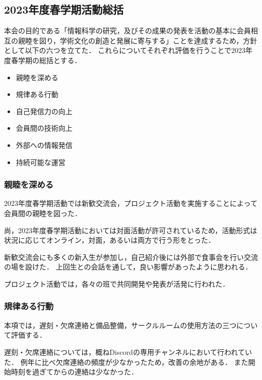 \subsection*{2023年度春学期活動総括}


本会の目的である「情報科学の研究，及びその成果の発表を活動の基本に会員相互の親睦を図り，学術文化の創造と発展に寄与する」ことを達成するため，方針として以下の六つを立てた．
これらについてそれぞれ評価を行うことで2023年度春学期の総括とする．

\begin{itemize}
  \item 親睦を深める
  \item 規律ある行動
  \item 自己発信力の向上
  \item 会員間の技術向上
  \item 外部への情報発信
  \item 持続可能な運営
\end{itemize}

\subsubsection*{親睦を深める}
2023年度春学期活動では新歓交流会，プロジェクト活動を実施することによって会員間の親睦を図った．

尚，2023年度春学期活動においては対面活動が許可されているため，活動形式は状況に応じてオンライン，対面，あるいは両方で行う形をとった．

新歓交流会にも多くの新入生が参加し，自己紹介後には外部で食事会を行い交流の場を設けた．
上回生との会話を通して，良い影響があったように思われる．

プロジェクト活動では，各々の班で共同開発や発表が活発に行われた．

\subsubsection*{規律ある行動}
本項では，遅刻・欠席連絡と備品整備，サークルルームの使用方法の三つについて評価する．

遅刻・欠席連絡については，概ねDiscordの専用チャンネルにおいて行われていた．
例年に比べ欠席連絡の頻度が少なかったため，改善の余地がある．
また開始時刻を過ぎてからの連絡は少なかった．

